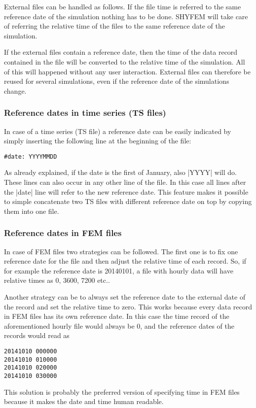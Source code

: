 \documentclass[12pt,draft]{article}
\newcommand{\shyfem}{SHYFEM}
\begin{document}
External files can be handled as follows. If the file time is referred
to the same reference date of the simulation nothing has to be
done. \shyfem{} will take care of referring the relative time of the
files to the same reference date of the simulation.

If the external files contain a reference date, then the time
of the data record contained in the file will be converted to
the relative time of the simulation. All of this will happened
without any user interaction. External files can therefore be 
reused for several simulations, even if the reference date
of the simulations change.

\subsubsection{Reference dates in time series (TS files)}

In case of a time series (TS file) a reference date can be easily indicated by simply inserting the following line at the
beginning of the file:
\begin{verbatim}
#date: YYYYMMDD
\end{verbatim}
As already explained, if the date is the first of January, also |YYYY|
will do. These lines can also occur in any other line of the file.
In this case all lines after the |date| line will refer to the new
reference date. This feature makes it possible to simple
concatenate two TS files with different reference date on top
by copying them into one file.


\subsubsection{Reference dates in FEM files}

In case of FEM files two strategies can be followed. The first
one is to fix one reference date for the file and then adjust
the relative time of each record. So, if for example the reference
date is 20140101, a file with hourly data will have relative times
as 0, 3600, 7200 etc..

Another strategy can be to always set the reference date to
the external date of the record and set the relative time to zero.
This works because every data record in FEM files has its own 
reference date. In this case the time record of the aforementioned
hourly file would always be 0, and the reference dates of the
records would read as
\begin{verbatim}
20141010 000000
20141010 010000
20141010 020000
20141010 030000
\end{verbatim}
This solution is probably the preferred version of specifying
time in FEM files because it makes the date and time human
readable.
\end{document}
